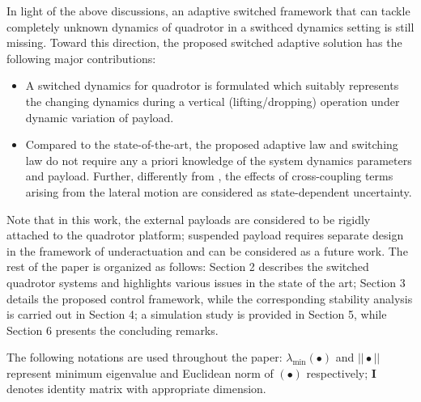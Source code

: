 \documentclass[AMA,STIX1COL,sort, compress]{WileyNJD-v2}
\begin{document}
%
In light of the above discussions, an adaptive switched framework that can tackle completely unknown dynamics of quadrotor in a swithced dynamics setting is still missing. Toward this direction, the proposed switched adaptive solution has the following major contributions: %
\begin{itemize}
	\item A switched dynamics for quadrotor is formulated which suitably represents the changing dynamics during a vertical (lifting/dropping) operation under dynamic variation of payload.
	\item Compared to the state-of-the-art, the proposed adaptive law and switching law do not require any a priori knowledge of the system dynamics parameters and payload. Further, differently from \cite{nicol2011robust, mofid2018adaptive}, the effects of cross-coupling terms arising from the lateral motion are considered as state-dependent uncertainty. 
	
	
\end{itemize} 

Note that in this work, the external payloads are considered to be rigidly attached to the quadrotor platform; suspended payload requires separate design in the framework of underactuation and can be considered as a future work. The rest of the paper is organized as follows: Section 2 describes the switched quadrotor systems and highlights various issues in the state of the art; Section 3 details the proposed control framework, while the corresponding stability analysis is carried out in Section 4; a simulation study is provided in Section 5, while Section 6 presents the concluding remarks.

The following notations are used throughout the paper: $\lambda _{\min}(\bullet)$ and $|| \bullet ||$ represent minimum eigenvalue and Euclidean norm of $(\bullet)$ respectively; $\mathbf I$ denotes identity matrix with appropriate dimension.%
\end{document}
